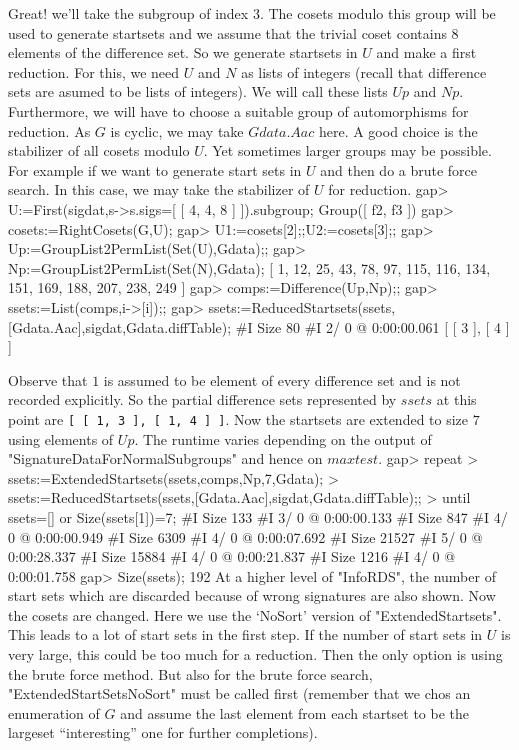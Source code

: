 Great! we'll take the subgroup of index $3$. The cosets modulo this
group will be used to generate startsets and we assume that the
trivial coset contains $8$ elements of the difference set.
So we generate startsets in $U$ and make a first reduction. For this,
we need $U$ and $N$ as lists of integers (recall that difference sets are
asumed to be lists of integers). We will call these lists $Up$ and
$Np$.
Furthermore, we will have to choose a suitable group of automorphisms
for reduction. As $G$ is cyclic, we may take $Gdata.Aac$ here. A good
choice is the stabilizer of all cosets modulo $U$. Yet sometimes
larger groups may be possible. For example if we want to generate
start sets in $U$ and then do a brute force search. In this case, we
may take the stabilizer of $U$ for reduction.
\beginexample
gap> U:=First(sigdat,s->s.sigs=[ [ 4, 4, 8 ] ]).subgroup; 
Group([ f2, f3 ])
gap> cosets:=RightCosets(G,U);
gap> U1:=cosets[2];;U2:=cosets[3];;
gap> Up:=GroupList2PermList(Set(U),Gdata);;  
gap> Np:=GroupList2PermList(Set(N),Gdata); 
[ 1, 12, 25, 43, 78, 97, 115, 116, 134, 151, 169, 188, 207, 238, 249 ]
gap> comps:=Difference(Up,Np);; 
gap> ssets:=List(comps,i->[i]);;
gap> ssets:=ReducedStartsets(ssets,[Gdata.Aac],sigdat,Gdata.diffTable); 
#I  Size 80
#I  2/ 0 @ 0:00:00.061
[ [ 3 ], [ 4 ] ]
\endexample

Observe that $1$ is assumed to be element of every difference set and
is not recorded explicitly. So the partial difference sets represented
by $ssets$ at this point are {\tt[ [ 1, 3 ], [ 1, 4 ] ]}. Now the
startsets are extended to size $7$ using elements of $Up$. The runtime
varies depending on the output of "SignatureDataForNormalSubgroups"
and hence on $maxtest$.
\beginexample
gap> repeat 
>     ssets:=ExtendedStartsets(ssets,comps,Np,7,Gdata); 
>     ssets:=ReducedStartsets(ssets,[Gdata.Aac],sigdat,Gdata.diffTable);; 
> until ssets=[] or Size(ssets[1])=7; 
#I  Size 133
#I  3/ 0 @ 0:00:00.133
#I  Size 847
#I  4/ 0 @ 0:00:00.949
#I  Size 6309
#I  4/ 0 @ 0:00:07.692
#I  Size 21527
#I  5/ 0 @ 0:00:28.337
#I  Size 15884
#I  4/ 0 @ 0:00:21.837
#I  Size 1216
#I  4/ 0 @ 0:00:01.758
gap> Size(ssets);
192
\endexample
At a higher level of "InfoRDS", the number of start sets which are
discarded because of wrong signatures are also shown.
Now the cosets are changed. Here we use the `NoSort' version of
"ExtendedStartsets".  This leads to a lot of start sets in the first
step. If the number of start sets in $U$ is very large, this could be
too much for a reduction. Then the only option is using the brute
force method. But also for the brute force search,
"ExtendedStartSetsNoSort" must be called first (remember that we chos
an enumeration of $G$ and assume the last element from each startset
to be the largeset ``interesting'' one for further completions).

